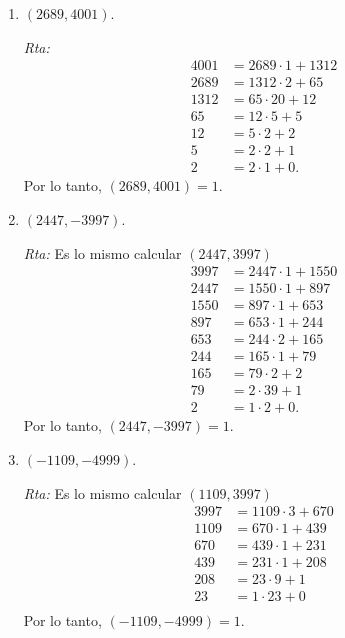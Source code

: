 \documentclass[a4paper,12pt,twoside,spanish,reqno]{amsbook}
\numberwithin{equation}{section}
\newcommand{\rta}{\noindent\textit{Rta: }}
\begin{document}
\begin{enumerate}
\begin{enumerate}
      \item  $(2689,4001)$.
      
      \rta
      \begin{align*}
        4001 &= 2689 \cdot 1  + 1312 \\
        2689 &= 1312 \cdot 2 + 65 \\
        1312 &= 65 \cdot 20 + 12 \\
        65 &= 12 \cdot 5 + 5 \\
        12 &= 5 \cdot 2 + 2 \\
        5 &= 2 \cdot 2 + 1 \\
        2 &= 2 \cdot 1 + 0.
    \end{align*}
    Por lo tanto, $ (2689, 4001)=1$.

      \item  $(2447,-3997)$.
      
      \rta Es lo mismo calcular  $(2447,3997)$
      \begin{align*}
        3997 &= 2447 \cdot 1  + 1550 \\
        2447 &= 1550 \cdot 1 + 897 \\
        1550 &= 897 \cdot 1 + 653 \\
        897 &= 653 \cdot 1 + 244 \\
        653 &= 244 \cdot 2 + 165 \\
        244 &= 165 \cdot 1 + 79 \\
        165 &= 79 \cdot 2 + 2 \\
        79 &= 2 \cdot 39 + 1 \\
        2 &= 1 \cdot 2 + 0.
    \end{align*}
    Por lo tanto, $(2447,-3997)=1$.

      \item $(-1109,-4999)$.
      
      \rta Es lo mismo calcular  $(1109,3997)$
      \begin{align*}
        3997 &= 1109 \cdot 3  + 670 \\
        1109 &= 670 \cdot 1  + 439 \\
        670 &= 439 \cdot 1  + 231 \\
        439 &= 231 \cdot 1  + 208 \\
        208 &= 23 \cdot 9  + 1 \\
        23 &= 1 \cdot 23  + 0 \\
    \end{align*}
    Por lo tanto, $(-1109,-4999)=1$.
      

\end{enumerate}
\end{enumerate}
\end{document}
